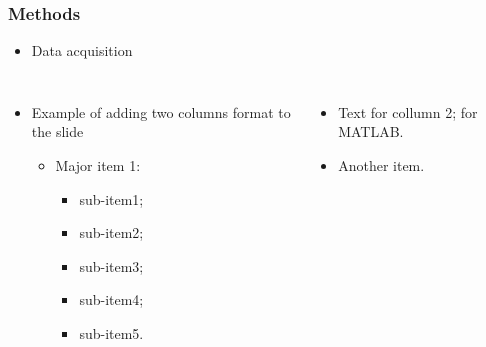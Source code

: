 \begin{frame}
    \frametitle{Methods}
    \begin{itemize}
        \item Data acquisition
    \end{itemize}
    \begin{table}
    \end{table}
        \vfill
        \begin{columns}
        \begin{itemize}
            \item Example of adding two columns format to the slide
            \begin{itemize}
                \item Major item 1: 
                \begin{itemize}
                    \item sub-item1;
                    \item sub-item2;
                    \item sub-item3;
                    \item sub-item4;
                    \item sub-item5.
                \end{itemize}  
            \end{itemize}
        \end{itemize}

        \begin{itemize}
            \item Text for collumn 2; 
             for MATLAB.
            \item Another item.
        \end{itemize}
        
        
    \end{columns}
    \parnotes

\end{frame}

